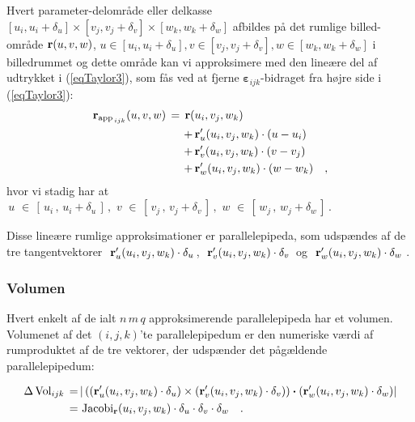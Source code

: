 Hvert parameter-delområde eller delkasse $[u_{i},
u_{i}+\delta_{u}]\times[v_{j}, v_{j}+\delta_{v}]\times[w_{k}, w_{k}
+ \delta_{w}]$ afbildes på det rumlige billed-område  ${\bf
r}(u,v,w)$, $u \in[u_{i}, u_{i}+\delta_{u}], v \in[v_{j},
v_{j}+\delta_{v}], w \in[w_{k}, w_{k}+\delta_{w}]$ i billedrummet og
dette område kan vi approksimere med den lineære del af udtrykket i
(\ref{eqTaylor3}), som fås ved at fjerne
${\bm{\varepsilon}}_{ijk}$-bidraget fra højre side i
(\ref{eqTaylor3}):
\begin{equation}\label{eqApp3}
\begin{aligned}
{\bf r}_{\operatorname{app}_{\,ijk}}(u, v,w) \, = \, {\bf r}(&u_{i}, v_{j}, w_{k}) \\
+ \, &{\bf r}'_{u}(u_{i}, v_{j}, w_{k})\cdot(u-u_{i}) \\+ \, &{\bf
r}'_{v}(u_{i}, v_{j}, w_{k})\cdot(v-v_{j}) \\+ \, &{\bf
r}'_{w}(u_{i}, v_{j}, w_{k})\cdot(w-w_{k}) \quad ,
\end{aligned}
\end{equation}
hvor vi stadig har at $\, u\, \, \in\, \left[\, u_{i}\, , \, u_{i}
+ \delta_{u}\,\right]\, , \,\, v\, \, \in\, \left[\, v_{j}\, , \,
v_{j} + \delta_{v}\,\right]\, , \,\, w\, \, \in\, \left[\, w_{j}\,
, \, w_{j} + \delta_{w}\,\right]\, . $

Disse lineære rumlige approksimationer er
parallelepipeda, som udspændes af de tre
tangentvektorer $\,\,{\bf r}'_{u}(u_{i}, v_{j},
w_{k} )\cdot\delta_{u}\,$, $\,\,{\bf
r}'_{v}(u_{i}, v_{j}, w_{k})\cdot \delta_{v}\,$
og $\,\,{\bf r}'_{w}(u_{i}, v_{j}, w_{k})\cdot
\delta_{w}$ .



\subsubsection{Volumen} \label{subsubRumfang}
Hvert enkelt af de ialt $n\,m\,q$ approksimerende
parallelepipeda har et volumen. Volumenet af det
$(i, j, k)$'te parallelepipedum er den numeriske
værdi af rumproduktet af de tre vektorer, der
udspænder det pågældende parallelepipedum:


\begin{equation}
\begin{aligned}
 \Delta \operatorname{Vol}_{ijk} \, = \, & | \left( ({\bf r}'_{u}(u_{i},
v_{j}, w_{k})\cdot \delta_{u}) \times ({\bf r}'_{v}(u_{i}, v_{j},
w_{k})\cdot \delta_{v})\right) \bm{\cdot} ({\bf r}'_{w}(u_{i}, v_{j}, w_{k})\cdot
\delta_{w}) | \\
\, = \, &\operatorname{Jacobi}_{\bf r}(u_{i}, v_{j}, w_{k})\cdot
\delta_{u}\cdot \delta_{v} \cdot \delta_{w} \quad.
\end{aligned}
\end{equation}

